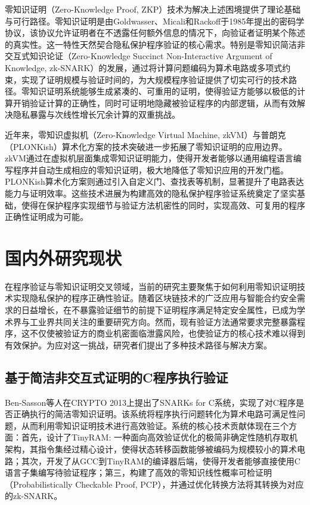 零知识证明（Zero-Knowledge Proof, ZKP）技术为解决上述困境提供了理论基础与可行路径。零知识证明是由Goldwasser、Micali和Rackoff于1985年提出的密码学协议\cite{DBLP:journals/siamcomp/GoldwasserMR89}，该协议允许证明者在不透露任何额外信息的情况下，向验证者证明某个陈述的真实性。这一特性天然契合隐私保护程序验证的核心需求。特别是零知识简洁非交互式知识论证（Zero-Knowledge Succinct Non-Interactive Argument of Knowledge, zk-SNARK）的发展，通过将计算问题编码为算术电路或多项式约束，实现了证明规模与验证时间的\cite{groth16}，为大规模程序验证提供了切实可行的技术路径。零知识证明系统能够生成紧凑的、可重用的证明，使得验证方能够以极低的计算开销验证计算的正确性，同时可证明地隐藏被验证程序的内部逻辑，从而有效解决隐私暴露与次线性增长冗余计算的双重挑战。\cite{10.5555/2671225.2671275}

近年来，零知识虚拟机（Zero-Knowledge Virtual Machine, zkVM）与普朗克（PLONKish）算术化方案的技术突破进一步拓展了零知识证明的应用边界\cite{DBLP:journals/iacr/GabizonWC19}。zkVM通过在虚拟机层面集成零知识证明能力，使得开发者能够以通用编程语言编写程序并自动生成相应的零知识证明，极大地降低了零知识应用的开发门槛。PLONKish算术化方案则通过引入自定义门、查找表等机制，显著提升了电路表达能力与证明效率。这些技术进展为构建高效的隐私保护程序验证系统奠定了坚实基础，使得在保护程序实现细节与验证方法机密性的同时，实现高效、可复用的程序正确性证明成为可能。\cite{Gabizon2019PLONKPO}

\section{国内外研究现状}
在程序验证与零知识证明交叉领域，当前的研究主要聚焦于如何利用零知识证明技术实现隐私保护的程序正确性验证。随着区块链技术的广泛应用与智能合约安全需求的日益增长，在不暴露验证细节的前提下证明程序满足特定安全属性\cite{10.1007/978-3-031-82703-7_11}，已成为学术界与工业界共同关注的重要研究方向。然而，现有验证方法通常要求完整暴露程序，这不仅使被验证方的商业机密面临泄露风险，也使验证方的核心技术难以得到有效保护。为应对这一挑战，研究者们提出了多种技术路径与解决方案。


\subsection{基于简洁非交互式证明的C程序执行验证}
Ben-Sasson等人在CRYPTO 2013上提出了SNARKs for C系统\cite{10.1007/978-3-642-40084-1_6}，实现了对C程序是否正确执行的简洁零知识证明。该系统将程序执行问题转化为算术电路可满足性问题，从而利用零知识证明技术进行高效验证。系统的核心技术贡献体现在三个方面：首先，设计了TinyRAM: 一种面向高效验证优化的极简非确定性随机存取机架构，其指令集经过精心设计，使得状态转移函数能够被编码为规模较小的算术电路；其次，开发了从GCC到TinyRAM的编译器后端，使得开发者能够直接使用C语言子集编写待验证程序；第三，构建了高效的零知识线性概率可检证明（Probabilistically Checkable Proof, PCP），并通过优化转换方法将其转换为对应的zk-SNARK。


